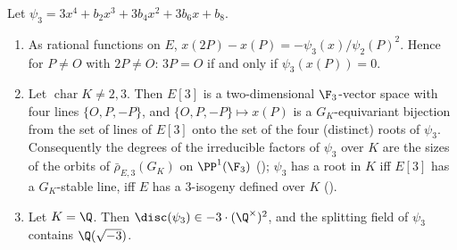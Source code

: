 \begin{proposition}\label{prop:ellcurves:psi3}
Let $\psi_3=3x^4+b_2x^3+3b_4x^2+3b_6x+b_8$.
\begin{enumerate}[label=(\roman*)]
\item As rational functions on $E$, $x(2P)-x(P)=-\psi_3(x)/\psi_2(P)^2$. Hence for $P\ne O$ with $2P\ne O$: $3P=O$ if and only if $\psi_3(x(P))=0$.
\item Let $\operatorname{char}K\ne2,3$. Then $E[3]$ is a two-dimensional $\F_3$-vector space with four lines $\{O,P,-P\}$, and $\{O,P,-P\}\mapsto x(P)$ is a $G_K$-equivariant
bijection from the set of lines of $E[3]$ onto the set of the four (distinct) roots of $\psi_3$. Consequently the degrees of the irreducible factors of $\psi_3$ over
$K$ are the sizes of the orbits of $\bar\rho_{E,3}(G_K)$ on $\PP^1(\F_3)$ (); $\psi_3$ has a root in $K$ iff $E[3]$ has a $G_K$-stable line, iff $E$
has a $3$-isogeny defined over $K$ ().
\item Let $K=\Q$. Then $\disc(\psi_3)\in-3\cdot(\Q^\times)^2$, and the splitting field of $\psi_3$ contains $\Q(\sqrt{-3})$.
\end{enumerate}
\end{proposition}

